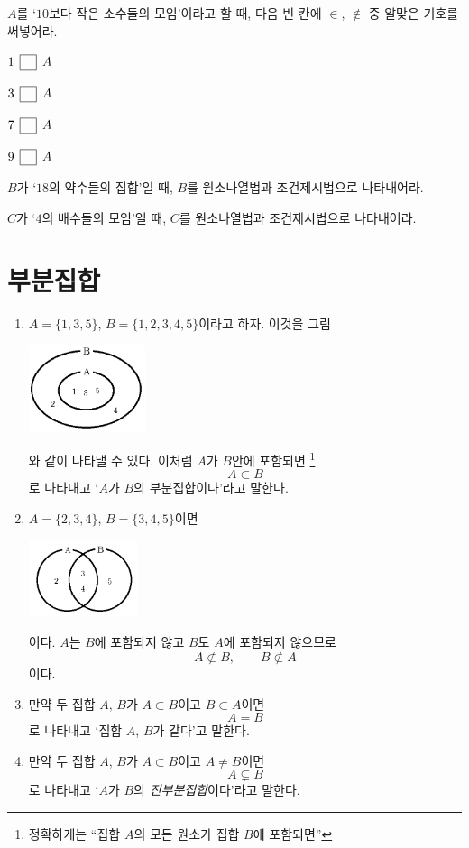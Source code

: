 \documentclass{oblivoir}
\begin{document}
%
\prob{}\label{sets4}
\(A\)를 `\(10\)보다 작은 소수들의 모임'이라고 할 때, 다음 빈 칸에 \(\in\), \(\notin\) 중 알맞은 기호를 써넣어라.
\\[10pt]
\begin{enumerate*}[itemjoin={,\qquad\qquad}]
\item
\(1\:\:\pb{\in}\:\:A\)
\item
\(3\:\:\pb{\in}\:\:A\)
\item
\(7\:\:\pb{\in}\:\:A\)
\item
\(9\:\:\pb{\in}\:\:A\)
\end{enumerate*}

%
\prob{}\label{sets5}
\(B\)가 `\(18\)의 약수들의 집합'일 때, \(B\)를 원소나열법과 조건제시법으로 나타내어라.

%
\prob{}\label{sets6}
\(C\)가 `\(4\)의 배수들의 모임'일 때, \(C\)를 원소나열법과 조건제시법으로 나타내어라.

\section{부분집합}
%
\exam{}
\begin{enumerate}\label{subset1}
\item
\(A=\{1,3,5\}\), \(B=\{1,2,3,4,5\}\)이라고 하자.
이것을 그림
\begin{center}
\includegraphics[width=0.27\textwidth]{subset_1}
\end{center}
와 같이 나타낼 수 있다.
이처럼 \(A\)가 \(B\)안에 포함되면
\footnote{정확하게는 ``집합 \(A\)의 모든 원소가 집합 \(B\)에 포함되면''}
\[A\subset B\]
로 나타내고 `\(A\)가 \(B\)의 부분집합이다'라고 말한다.
\item
\(A=\{2,3,4\}\), \(B=\{3,4,5\}\)이면
\begin{center}
\includegraphics[width=0.25\textwidth]{subset_2}
\end{center}
이다.
\(A\)는 \(B\)에 포함되지 않고 \(B\)도 \(A\)에 포함되지 않으므로
\[A\not\subset B,\qquad B\not\subset A\]
이다.
\item
만약 두 집합 \(A\), \(B\)가 \(A\subset B\)이고 \(B\subset A\)이면
\[A=B\]
로 나타내고 `집합 \(A\), \(B\)가 같다'고 말한다.
\item
만약 두 집합 \(A\), \(B\)가 \(A\subset B\)이고 \(A\neq B\)이면
\[A\subsetneq B\]
로 나타내고 `\(A\)가 \(B\)의 \emph{진부분집합}이다'라고 말한다.
\end{enumerate}
\end{document}
